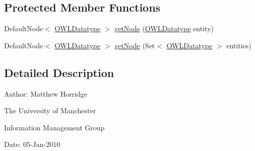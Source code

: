 \subsection*{Protected Member Functions}
\begin{DoxyCompactItemize}
\item 
Default\-Node$<$ \hyperlink{interfaceorg_1_1semanticweb_1_1owlapi_1_1model_1_1_o_w_l_datatype}{O\-W\-L\-Datatype} $>$ \hyperlink{classorg_1_1semanticweb_1_1owlapi_1_1reasoner_1_1impl_1_1_o_w_l_datatype_node_set_aaaa8525b2476818be109a3feab1c5f31}{get\-Node} (\hyperlink{interfaceorg_1_1semanticweb_1_1owlapi_1_1model_1_1_o_w_l_datatype}{O\-W\-L\-Datatype} entity)
\item 
Default\-Node$<$ \hyperlink{interfaceorg_1_1semanticweb_1_1owlapi_1_1model_1_1_o_w_l_datatype}{O\-W\-L\-Datatype} $>$ \hyperlink{classorg_1_1semanticweb_1_1owlapi_1_1reasoner_1_1impl_1_1_o_w_l_datatype_node_set_ae02da495ad422c2fb4b6a7deb9065476}{get\-Node} (Set$<$ \hyperlink{interfaceorg_1_1semanticweb_1_1owlapi_1_1model_1_1_o_w_l_datatype}{O\-W\-L\-Datatype} $>$ entities)
\end{DoxyCompactItemize}


\subsection{Detailed Description}
Author\-: Matthew Horridge\par
 The University of Manchester\par
 Information Management Group\par
 Date\-: 05-\/\-Jan-\/2010 


